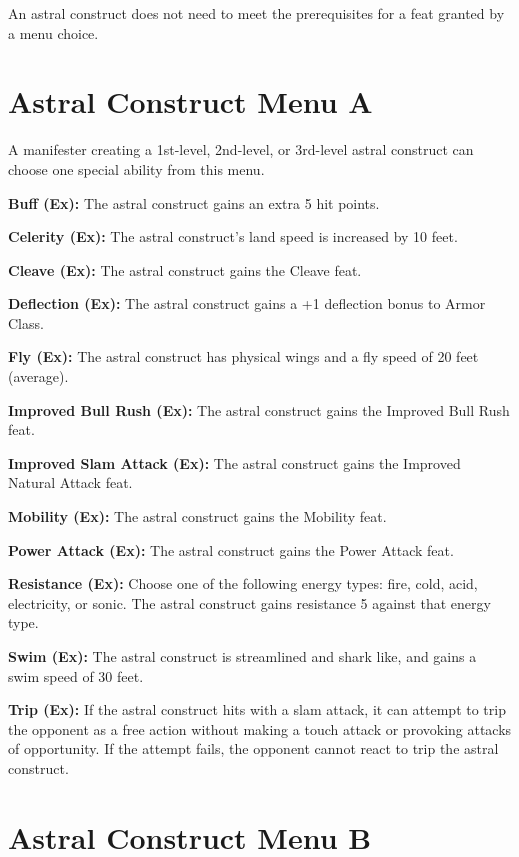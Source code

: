 \documentclass{article}
\begin{document}
An astral construct does not need to meet the prerequisites for a feat granted 
by a menu choice. 

\vspace{12pt}
\section*{Astral Construct Menu A}

A manifester creating a 1st-level, 2nd-level, or 3rd-level astral construct can 
choose one special ability from this menu.

\textbf{Buff (Ex): }The astral construct gains an extra 5 hit points.

\textbf{Celerity (Ex):} The astral construct's land speed is increased by 10 feet.

\textbf{Cleave (Ex):} The astral construct gains the Cleave feat. 

\textbf{Deflection (Ex):} The astral construct gains a +1 deflection bonus to Armor 
Class.

\textbf{Fly (Ex):} The astral construct has physical wings and a fly speed of 20 
feet (average).

\textbf{Improved Bull Rush (Ex):} The astral construct gains the Improved Bull 
Rush feat.

\textbf{Improved Slam Attack (Ex):} The astral construct gains the Improved Natural 
Attack feat.

\textbf{Mobility (Ex):} The astral construct gains the Mobility feat.

\textbf{Power Attack (Ex):} The astral construct gains the Power Attack feat.

\textbf{Resistance (Ex): }Choose one of the following energy types: fire, cold, 
acid, electricity, or sonic. The astral construct gains resistance 5 against that 
energy type.

\textbf{Swim (Ex):} The astral construct is streamlined and shark like, and gains 
a swim speed of 30 feet.

\textbf{Trip (Ex):} If the astral construct hits with a slam attack, it can attempt 
to trip the opponent as a free action without making a touch attack or provoking 
attacks of opportunity. If the attempt fails, the opponent cannot react to trip 
the astral construct.

\vspace{12pt}
\section*{Astral Construct Menu B}
\end{document}
